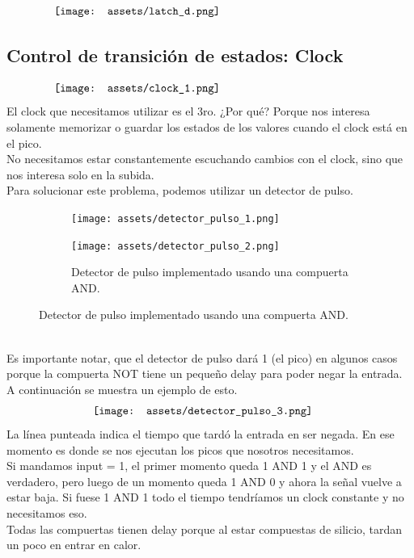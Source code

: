 \documentclass[10pt,a4paper]{article}
\begin{document}
\[\begin{minipage}[b]{0.8\textwidth}
    \texttt{[image: assets/latch\_d.png]}
    \label{fig:latch_d}
\end{minipage}\]

\subsection*{Control de transición de estados: Clock}
\[\begin{minipage}[b]{0.8\textwidth}
    \texttt{[image: assets/clock\_1.png]}
    \label{fig:clock_1}
\end{minipage}\]
El clock que necesitamos utilizar es el 3ro. ¿Por qué? Porque nos interesa solamente memorizar o guardar los estados de los valores cuando el clock está en el pico. \\
No necesitamos estar constantemente escuchando cambios con el clock, sino que nos interesa solo en la subida.
\\
Para solucionar este problema, podemos utilizar un detector de pulso.
\begin{figure}[h]
    \begin{subfigure}{0.4\textwidth}
        \centering
        \texttt{[image: assets/detector\_pulso\_1.png]}
        \label{fig:detector_pulso_1}
        \end{subfigure}
    \begin{subfigure}{0.7\textwidth}
        \centering
    \texttt{[image: assets/detector\_pulso\_2.png]}
    \caption{Detector de pulso implementado usando una compuerta AND. }
    \label{fig:detector_pulso_2}
    \end{subfigure}
    \end{figure}
\\ Es importante notar, que el detector de pulso dará 1 (el pico) en algunos casos porque la compuerta NOT tiene un pequeño delay para poder negar la entrada. A continuación se muestra un ejemplo de esto.
\[\begin{minipage}[b]{0.6\textwidth}
    \texttt{[image: assets/detector\_pulso\_3.png]}
    \label{fig:detector_pulso_3}
\end{minipage}\]
La línea punteada indica el tiempo que tardó la entrada en ser negada. En ese momento es donde se nos ejecutan los picos que nosotros necesitamos. \\
Si mandamos input = 1, el primer momento queda 1 AND 1 y el AND es verdadero, pero luego de un momento queda 1 AND 0 y ahora la señal vuelve a estar baja. Si fuese 1 AND 1 todo el tiempo tendríamos un clock constante y no necesitamos eso. \\
Todas las compuertas tienen delay porque al estar compuestas de silicio, tardan un poco en entrar en calor.\\
\end{document}
